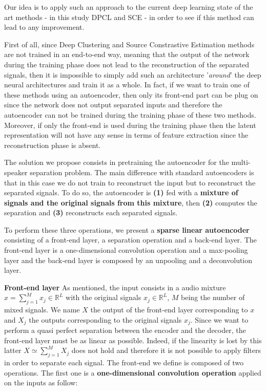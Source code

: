 \documentclass[master,final,11pt]{iscs-thesis}
\begin{document}
Our idea is to apply such an approach to the current deep learning state of the art methods - in this study DPCL and SCE - in order to see if this method can lead to any improvement.
 
First of all, since Deep Clustering and Source Constrastive Estimation methods are not trained in an end-to-end way, meaning that the output of the network during the training phase does not lead to the reconstruction of the separated signals, then it is impossible to simply add such an architecture '\textit{around}' the deep neural architectures and train it as a whole. In fact, if we want to train one of these methods using an autoencoder, then only its front-end part can be plug on since the network does not output separated inputs and therefore the autoencoder can not be trained during the training phase of these two methods. Moreover, if only the front-end is used during the training phase then the latent representation will not have any sense in terms of feature extraction since the reconstruction phase is absent. 

The solution we propose consists in pretraining the autoencoder for the multi-speaker separation problem. The main difference with standard autoencoders is that in this case we do not train to reconstruct the input but to reconstruct the separated signals. To do so, the autoencoder is \textbf{(1)} fed with a \textbf{mixture of signals and the original signals from this mixture}, then \textbf{(2)} computes the separation and \textbf{(3)} reconstructs each separated signals.

To perform these three operations, we present a \textbf{sparse linear autoencoder} consisting of a front-end layer, a separation operation and a back-end layer. The front-end layer is a one-dimensional convolution operation and a max-pooling layer and the back-end layer is composed by an unpooling and a deconvolution layer.

\textbf{Front-end layer}
As mentioned, the input consists in a audio mixture $x = \sum_{j=1}^{M}{x_j} \in \mathbb{R}^L$ with the original signals $x_j \in \mathbb{R}^L$, $M$ being the number of mixed signals. We name $X$ the output of the front-end layer corresponding to $x$ and $X_j$ the outputs corresponding to the original signals $x_j$. Since we want to perform a quasi perfect separation between the encoder and the decoder, the front-end layer must be as linear as possible. Indeed, if the linearity is lost by this latter $X \simeq \sum_{j=1}^{M}{X_j}$ does not hold and therefore it is not possible to apply filters in order to separate each signal.
The front-end we define is composed of two operations. The first one is a \textbf{one-dimensional convolution operation} applied on the inputs as follow:
\end{document}
